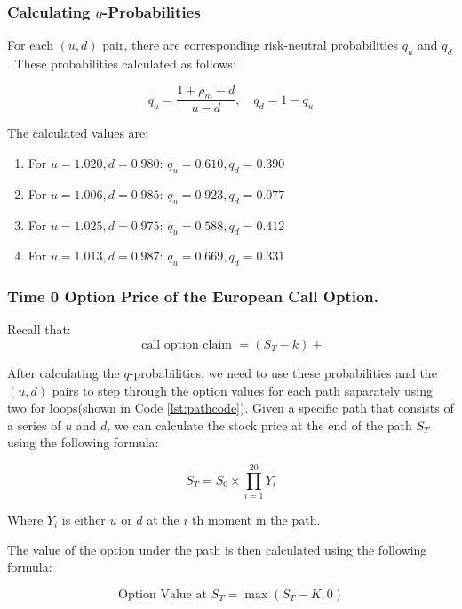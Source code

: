 \documentclass[12pt]{article}
\begin{document}
\subsubsection{Calculating \( q \)-Probabilities}

For each \( (u, d) \) pair, there are corresponding risk-neutral probabilities
\( q_u \) and \( q_d \). These probabilities calculated as follows:

\[
    q_u=\frac{1+\rho_m-d}{u-d}, \quad q_d=1-q_u
\]

The calculated values are:

\begin{enumerate}
    \item For \(u = 1.020, d = 0.980\): \( q_u = 0.610, q_d = 0.390 \)
    \item For \(u = 1.006, d = 0.985\): \( q_u = 0.923, q_d = 0.077 \)
    \item For \(u = 1.025, d = 0.975\): \( q_u = 0.588, q_d = 0.412 \)
    \item For \(u = 1.013, d = 0.987\): \( q_u = 0.669, q_d = 0.331 \)
\end{enumerate}

\subsubsection{Time 0 Option Price of the European Call Option.}

Recall that:
\[
    \text { call option claim }=\left(S_T-k\right)+
\]


After calculating the \( q \)-probabilities, we need to use these probabilities
and the \( (u, d) \) pairs to step through the option values for each path
saparately using two for loops(shown in Code \ref{lst:pathcode}).
Given a specific path that consists of a series of \( u \) and \( d \), we can
calculate the stock price at the end of the path \( S_T \) using the following
formula:

\[
    S_T = S_0 \times \prod_{i=1}^{20} Y_i
\]

Where \( Y_i \) is either \( u \) or \( d \) at the \( i \) th moment in the
path.

The value of the option under the path is then calculated using the following
formula:

\[
    \text{Option Value at } S_T = \max(S_T - K, 0)
\]
\end{document}
